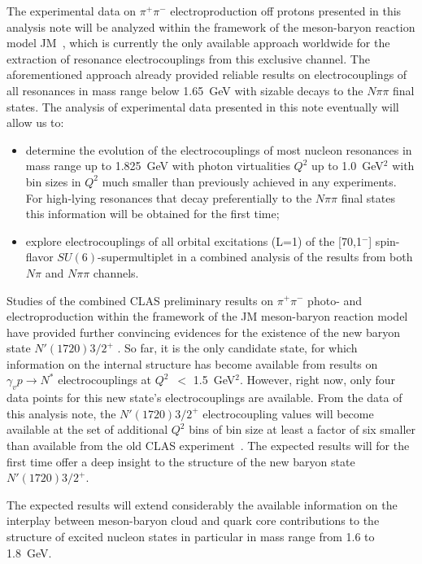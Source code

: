 The experimental data on $\pi^+\pi^-$ electroproduction off protons presented in this analysis note will be analyzed within the framework of the meson-baryon reaction model JM~\cite{Mokeev:2008iw,Mokeev:2012vsa,Mokeev:2015lda}, which is currently the only available approach worldwide for the extraction of resonance electrocouplings from this exclusive channel. The aforementioned approach already provided reliable results on electrocouplings of all resonances in mass range below 1.65~GeV with sizable decays to the $N\pi\pi$ final states. The analysis of experimental data presented in this note eventually will allow us to:
\begin{itemize}
\item determine the evolution of the electrocouplings of most nucleon resonances in mass range up to 1.825~GeV with photon virtualities $Q^2$ up to 1.0~GeV$^2$  with bin sizes in $Q^2$ much smaller than previously achieved in any experiments. For high-lying resonances that decay preferentially to the $N\pi\pi$ final states this information will be obtained for the first time;
\item explore electrocouplings of all orbital excitations (L=1) of the [70,1$^-$] spin-flavor $SU(6)$-supermultiplet in a combined analysis of the results from both $N\pi$ and $N\pi\pi$ channels.
\end{itemize} 

Studies of the combined CLAS preliminary results on $\pi^+\pi^-$ photo- and electroproduction \cite{Ripani:2002ss} within the framework of the JM meson-baryon reaction model have provided further convincing evidences for the existence of the new baryon state
$N'(1720)3/2^+$ \cite{Mokeev:2015moa}. So far, it is the only candidate state, for which information on the internal structure has become available from results on $\gamma_vp \rightarrow N^*$ electrocouplings at $Q^2$~$<$ 1.5~GeV$^2$. However, right now, only four data points for this new state's electrocouplings are available. From the data of this analysis note, the $N'(1720)3/2^+$ electrocoupling values will become available at the set of additional $Q^2$ bins of bin size at least a factor of  six smaller than available from the old CLAS experiment~\cite{Ripani:2002ss}. The expected results will for the first time offer a deep insight to the structure of the new baryon state  $N'(1720)3/2^+$.

The expected results will extend considerably the available information on the interplay between meson-baryon cloud and quark core contributions to the structure of excited nucleon states in particular in mass range from 1.6 to 1.8~GeV.

